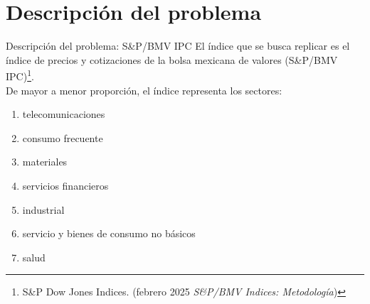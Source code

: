 \documentclass[aspectratio=169,xcolor=dvipsnames]{beamer}
\begin{document}
\section{Descripción del problema}
\begin{frame}{Descripción del problema: S\&P/BMV IPC}
    El índice que se busca replicar es el índice de precios y cotizaciones de la bolsa mexicana de valores
    (S\&P/BMV IPC)\footnote{S\&P Dow Jones Indices. (febrero 2025 \emph{S\&P/BMV Indices:
    Metodología})}. \\
    De mayor a menor proporción, el índice representa los sectores:
    \begin{enumerate}
        \item telecomunicaciones
        \item consumo frecuente
        \item materiales
        \item servicios financieros
        \item industrial
        \item servicio y bienes de consumo no básicos
        \item salud
    \end{enumerate}
\end{frame}
\end{document}
